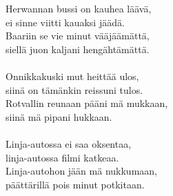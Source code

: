 
            Herwannan bussi on kauhea läävä, \\
            ei sinne viitti kauaksi jäädä. \\
            Baariin se vie minut vääjäämättä, \\
            siellä juon kaljani hengähtämättä. \\
\hspace{10mm} \\
            Onnikkakuski mut heittää ulos, \\
            siinä on tämänkin reissuni tulos. \\
            Rotvallin reunaan pääni mä mukkaan, \\
            siinä mä pipani hukkaan. \\
\hspace{10mm} \\
            Linja-autossa ei saa oksentaa, \\
            linja-autossa filmi katkeaa. \\
            Linja-autohon jään mä nukkumaan, \\
            päättärillä pois minut potkitaan. \\
